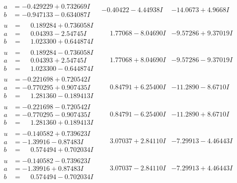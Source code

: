 \documentclass[1p]{elsarticle_modified}
\theoremstyle{definition}
\begin{document}
$$\begin{array}{c|c|c}
\begin{aligned}
a &= -0.429229 + 0.732669 I \\
b &= -0.947133 - 0.634087 I\end{aligned}
 & -0.40422 - 4.44938 I & -14.0673 + 4.9668 I \\ \hline\begin{aligned}
u &= \phantom{-}0.189284 + 0.736058 I \\
a &= \phantom{-}0.04393 - 2.54745 I \\
b &= \phantom{-}1.023300 + 0.644874 I\end{aligned}
 & \phantom{-}1.77068 - 8.04690 I & -9.57286 + 9.37019 I \\ \hline\begin{aligned}
u &= \phantom{-}0.189284 - 0.736058 I \\
a &= \phantom{-}0.04393 + 2.54745 I \\
b &= \phantom{-}1.023300 - 0.644874 I\end{aligned}
 & \phantom{-}1.77068 + 8.04690 I & -9.57286 - 9.37019 I \\ \hline\begin{aligned}
u &= -0.221698 + 0.720542 I \\
a &= -0.770295 + 0.907435 I \\
b &= \phantom{-}1.281360 - 0.189413 I\end{aligned}
 & \phantom{-}0.84791 + 6.25400 I & -11.2890 - 8.6710 I \\ \hline\begin{aligned}
u &= -0.221698 - 0.720542 I \\
a &= -0.770295 - 0.907435 I \\
b &= \phantom{-}1.281360 + 0.189413 I\end{aligned}
 & \phantom{-}0.84791 - 6.25400 I & -11.2890 + 8.6710 I \\ \hline\begin{aligned}
u &= -0.140582 + 0.739623 I \\
a &= -1.39916 - 0.87483 I \\
b &= \phantom{-}0.574494 + 0.702034 I\end{aligned}
 & \phantom{-}3.07037 + 2.84110 I & -7.29913 - 4.46443 I \\ \hline\begin{aligned}
u &= -0.140582 - 0.739623 I \\
a &= -1.39916 + 0.87483 I \\
b &= \phantom{-}0.574494 - 0.702034 I\end{aligned}
 & \phantom{-}3.07037 - 2.84110 I & -7.29913 + 4.46443 I \\ \hline\begin{aligned}

\end{aligned}
\end{array}$$
\end{document}

